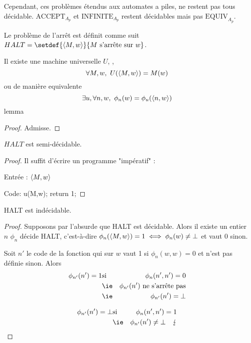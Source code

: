 Cependant, ces problèmes étendus aux automates a piles, ne restent pas tous décidable.
$\text{ACCEPT}_{A_p}$ et $\text{INFINITE}_{A_p}$ restent décidables mais pas $\text{EQUIV}_{A_p}$.

\begin{definition}
	Le problème de l'arrêt est définit comme suit $HALT = \setdef {\encode{M,w}} {M \text{ s'arrête sur } w}$.
\end{definition}

\begin{lemma}
	Il existe une machine universelle $U$, \ie, $$\forall M,w, \  U (\left\langle M,w\right\rangle) = M (w)$$
	ou de manière equivalente
	$$\exists u, \forall n,w, \ \phi_n(w) = \phi_u(\left\langle n,w\right\rangle)$$
	lemma\end{lemma}

\begin{proof}
	Admisse.
\end{proof}

\begin{prop}
	$HALT$ est semi-décidable.
\end{prop}

\begin{proof}
	Il suffit d'écrire un programme "impératif" :

	Entrée : $\left\langle M,w\right\rangle$

	Code:
	u(M,w);
	return 1;

\end{proof}

\begin{prop}
	HALT est indécidable.
\end{prop}

\begin{proof}
	Supposons par l'absurde que HALT est décidable. Alors il existe un entier $n$ \tq $\phi_n$ décide HALT, c'est-à-dire
	$ \phi_n(\left\langle M, w\right\rangle ) = 1 \iff \phi_n(w) \neq \bot $ et vaut $0$ sinon.

	Soit $n'$ le code de la fonction qui sur $w$ vaut 1 si $\phi_n (w,w) = 0 $ et n'est pas définie sinon. Alors
	\begin{eqnarray*}
		\phi_{n'}(n') = 1 & \text{si} & \phi_n(n',n') = 0\\
		&\text{\ie}& \phi_{n'}(n') \text{ ne s'arrête pas} \\
		&\text{\ie}& \phi_{n'}(n') = \bot
	\end{eqnarray*}


	\begin{eqnarray*}
		\phi_{n'}(n') = \bot & \text{si} & \phi_n(n',n') = 1\\
		&\text{\ie}& \phi_{n'}(n') \neq \bot \quad \lightning
	\end{eqnarray*}

\end{proof}
